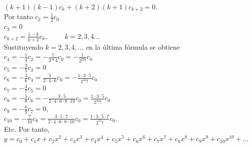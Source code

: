 \documentclass[12pt,letterpaper,oneside]{article}
\begin{document}
\hspace*{3cm} $(k+1)(k-1) c_k + (k + 2) (k + 1)c_{k+2} = 0.$\vspace{0.3cm}\\
Por tanto \hspace{2.5cm} $c_2 = \frac{1}{2} c_0$\vspace{0.3cm}\\
\hspace*{4.4cm} $c_3 = 0$\vspace{0.3cm}\\
\hspace*{4.4cm} $c_{k+2} = \frac{1 - k}{k + 2}c_k,\hspace{1cm} k=2,3,4...$\vspace{0.3cm}\\
Sustituyendo $k = 2,3,4,...$ en la última fórmula se obtiene\\
\hspace*{3.5cm} $c_4 = - \frac{1}{4} c_2 = - \frac{1}{2*4}c_0 = - \frac{1}{2^22!} c_0$\vspace{0.3cm}\\
\hspace*{3.5cm} $c_5 = - \frac{2}{5} c_3 = 0$\vspace{0.3cm}\\
\hspace*{3.5cm} $c_6 = - \frac{3}{6} c_4 = \frac{3}{2\cdot 4 \cdot 6} c_0 = - \frac{1\cdot3\cdot5}{2^44!} c_0$\vspace{0.3cm}\\
\hspace*{3.5cm} $ c_7 = - \frac{4}{7} c_5 =0$ \vspace{0.3cm}\\
\hspace*{3.5cm} $c_8 = - \frac{5}{8} c_6 = - \frac{3\cdot5}{2\cdot4\cdot6\cdot8\cdot10} c_0 = \frac{1\cdot3\cdot5}{2^44!}c_0$ \vspace{0.3cm}\\
\hspace*{3.5cm} $c_9 = - \frac{6}{9} c_7 = 0$, \vspace{0.3cm}\\
\hspace*{3.5cm} $c_10 = - \frac{7}{10} c_8 = \frac{3\cdot5\cdot7}{2\cdot4\cdot6\cdot8\cdot10} c_0 = \frac{1\cdot3\cdot5\cdot7}{2^55!} c_0.$ \vspace{0.3cm}\\
Etc. Por tanto,\\
$y = c_0 + c_1x + c_2x^2 + c_3x^3 + c_4x^4 + c_5x^5 + c_6x^6 + c_7x^7 + c_8x^8 + c_9x^9 + c_10x^10 + ...$\vspace{0.3cm}\\ 
\end{document}
